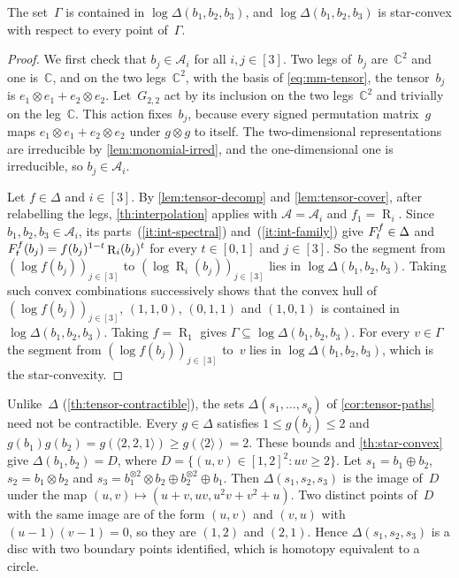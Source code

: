 \documentclass[11pt,letterpaper]{article}
\DeclareMathOperator{\tensorrank}{R}
\newcommand{\CC}{\mathbb{C}}
\begin{document}
\begin{theorem}\label{th:star-convex}
The set~$\Gamma$ is contained in $\log \Delta(b_1,b_2,b_3)$, and $\log \Delta(b_1,b_2,b_3)$ is star-convex with respect to every point of~$\Gamma$.
\end{theorem}
\begin{proof}
We first check that $b_j \in \mathcal{A}_i$ for all $i, j \in [3]$. Two legs of~$b_j$ are~$\CC^2$ and one is~$\CC$, and on the two legs~$\CC^2$, with the basis of \eqref{eq:mm-tensor}, the tensor~$b_j$ is $e_1 \otimes e_1 + e_2 \otimes e_2$. Let~$G_{2,2}$ act by its inclusion on the two legs~$\CC^2$ and trivially on the leg~$\CC$. This action fixes~$b_j$, because every signed permutation matrix~$g$ maps $e_1 \otimes e_1 + e_2 \otimes e_2$ under $g \otimes g$ to itself. The two-dimensional representations are irreducible by \cref{lem:monomial-irred}, and the one-dimensional one is irreducible, so $b_j \in \mathcal{A}_i$.

Let $f \in \Delta$ and $i \in [3]$. By \cref{lem:tensor-decomp} and \cref{lem:tensor-cover}, after relabelling the legs, \cref{th:interpolation} applies with $\mathcal{A} = \mathcal{A}_i$ and $f_1 = \tensorrank_i$. Since $b_1, b_2, b_3 \in \mathcal{A}_i$, its parts~(\ref{it:int-spectral}) and~(\ref{it:int-family}) give $F^{\smash[t]{f}}_t \in \Delta$ and $F^{\smash[t]{f}}_t(b_j) = f(b_j)^{1-t} \tensorrank_i(b_j)^t$ for every $t \in [0,1]$ and $j \in [3]$.
So the segment from $(\log f(b_j))_{j \in [3]}$ to $(\log \tensorrank_i(b_j))_{j \in [3]}$ lies in $\log \Delta(b_1,b_2,b_3)$. Taking such convex combinations successively shows that the convex hull of $(\log f(b_j))_{j \in [3]}$, $(1,1,0)$, $(0,1,1)$ and $(1,0,1)$ is contained in $\log \Delta(b_1,b_2,b_3)$. Taking $f = \tensorrank_1$ gives $\Gamma \subseteq \log \Delta(b_1,b_2,b_3)$. For every $v \in \Gamma$ the segment from $(\log f(b_j))_{j \in [3]}$ to~$v$ lies in $\log \Delta(b_1,b_2,b_3)$, which is the star-convexity.
\end{proof}

Unlike~$\Delta$ (\cref{th:tensor-contractible}), the sets $\Delta(s_1, \ldots, s_q)$ of \cref{cor:tensor-paths} need not be contractible. Every $g \in \Delta$ satisfies $1 \leq g(b_j) \leq 2$ and $g(b_1) g(b_2) = g(\langle 2,2,1 \rangle) \geq g(\langle 2 \rangle) = 2$. These bounds and \cref{th:star-convex} give $\Delta(b_1, b_2) = D$, where $D = \{(u,v) \in [1,2]^2 : uv \geq 2\}$. Let $s_1 = b_1 \oplus b_2$, $s_2 = b_1 \otimes b_2$ and $s_3 = b_1^{\otimes 2} \otimes b_2 \oplus b_2^{\otimes 2} \oplus b_1$. Then $\Delta(s_1, s_2, s_3)$ is the image of~$D$ under the map $(u,v) \mapsto (u+v, uv, u^2v + v^2 + u)$. Two distinct points of~$D$ with the same image are of the form $(u,v)$ and $(v,u)$ with $(u-1)(v-1) = 0$, so they are $(1,2)$ and $(2,1)$. Hence $\Delta(s_1, s_2, s_3)$ is a disc with two boundary points identified, which is homotopy equivalent to a circle.
\end{document}

